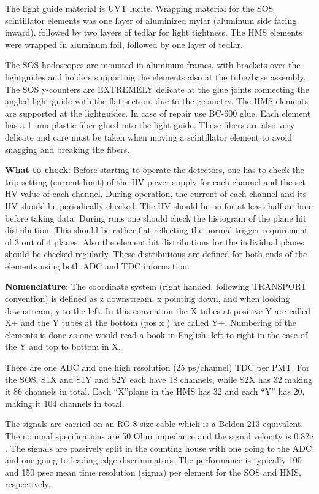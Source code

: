 	The light guide material is UVT lucite.  Wrapping material for the SOS scintillator elements was one layer of 
aluminized mylar (aluminum side facing inward), followed by two layers of
tedlar for light tightness. The HMS elements were wrapped in aluminum foil,
followed by one layer of tedlar.

	The SOS hodoscopes are mounted in aluminum frames, with brackets over
the lightguides and holders supporting the elements also at the tube/base
assembly. The SOS y-counters are EXTREMELY delicate at the glue joints
connecting the angled light guide with the flat section, due to the geometry.
The HMS elements are supported at the lightguides. In case of repair use BC-600
glue. Each element has a 1 mm plastic fiber glued into the light guide. These
fibers are also very delicate and care must be taken when moving a scintillator
element to avoid snagging and breaking the fibers.

{\bf What to check}: Before starting to operate the detectors, one has to
check the trip setting (current limit) of the HV power supply for each channel
and the set HV value of each channel. During operation, the current of each
channel and its HV should be periodically checked. The HV should be on for at
least half an hour before taking data. During runs one should check the
histogram of the plane hit distribution. This should be rather flat reflecting
the normal trigger requirement of 3 out of 4 planes. Also the element hit
distributions for the individual planes should be checked regularly. These
distributions are defined for both ends of the elements using both ADC and TDC
information.

{\bf Nomenclature}:
The coordinate system (right handed, following TRANSPORT
convention) is defined as z downstream, x pointing down, and when looking
downstream, y to the left. In this convention the X-tubes at positive Y are
called X+ and the Y tubes at the bottom (pos x ) are called Y+. Numbering of
the elements is done as one would read a book in English: left to right in the
case of the Y and top to bottom in X.

	There are one ADC and one high resolution (25 ps/channel) TDC per PMT.
For the SOS, S1X and S1Y and S2Y each have 18 channels, while S2X has 32 making
it 86 channels in total. Each ``X''plane in the HMS has 32 and each
``Y'' has 20, making it 104 channels in total.

	The signals are carried on an RG-8 size cable which is a Belden 213
equivalent. The nominal specifications are 50 Ohm impedance and the signal
velocity is 0.82c . The signals are passively split in the counting house with
one going to the ADC and one going to leading edge discriminators. The
performance is typically 100 and 150 psec mean time resolution (sigma) per
element for the SOS and HMS, respectively.

